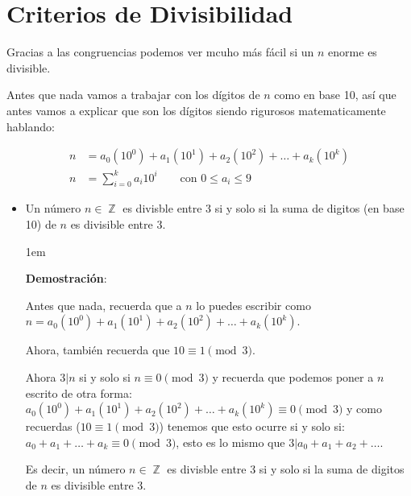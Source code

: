 \documentclass[12pt, fleqn]{report}                             %
\newenvironment{SmallIndentation}[1][0.75em]                    %
    {\begin{adjustwidth}{#1}{}\begin{footnotesize}}                 %
    {\end{footnotesize}\end{adjustwidth}}                           %
\DeclareMathOperator \Space {\quad}                             %
\DeclareMathOperator \Integers  {\mathbb{Z}}                     %
\begin{document}
    \clearpage
    \section{Criterios de Divisibilidad}

        Gracias a las congruencias podemos ver mcuho más fácil si un $n$ enorme
        es divisible.

        Antes que nada vamos a trabajar con los dígitos de $n$ como en base 10,
        así que antes vamos a explicar que son los dígitos siendo rigurosos matematicamente
        hablando:

        \begin{equation}
        \begin{split}
            n &= a_0(10^0) + a_1(10^1) + a_2(10^2) + \dots + a_k(10^k)          \\
            n &= \sum_{i=0}^{k} a_i 10^i \Space \text{ con } 0 \leq a_i \leq 9
        \end{split}
        \end{equation}


        \begin{itemize}

            \item Un número $n \in \Integers$ es divisble entre 3 si y solo si
                la suma de digitos (en base 10) de $n$ es divisible entre 3.

                \begin{SmallIndentation}[1em]
                    \textbf{Demostración}:

                    Antes que nada, recuerda que a $n$ lo puedes escribir como
                    $n = a_0(10^0) + a_1(10^1) + a_2(10^2) + \dots + a_k(10^k)$.

                    Ahora, también recuerda que $10 \equiv 1 \pmod{3}$.

                    Ahora $3|n$ si y solo si $n \equiv 0 \pmod{3}$ y recuerda
                    que podemos poner a $n$ escrito de otra forma:
                    $a_0(10^0) + a_1(10^1) + a_2(10^2) + \dots + a_k(10^k) \equiv 0 \pmod{3}$
                    y como recuerdas ($10 \equiv 1 \pmod{3}$) tenemos que esto ocurre
                    si y solo si:  $a_0 + a_1 +\dots +a_k \equiv 0 \pmod{3}$, esto es lo mismo que
                    $3|a_0+a_1+a_2+\dots$.

                    Es decir, un número $n \in \Integers$ es divisble entre 3 si y solo si
                    la suma de digitos de $n$ es divisible entre 3.

                \end{SmallIndentation}

        \end{itemize}
\end{document}

